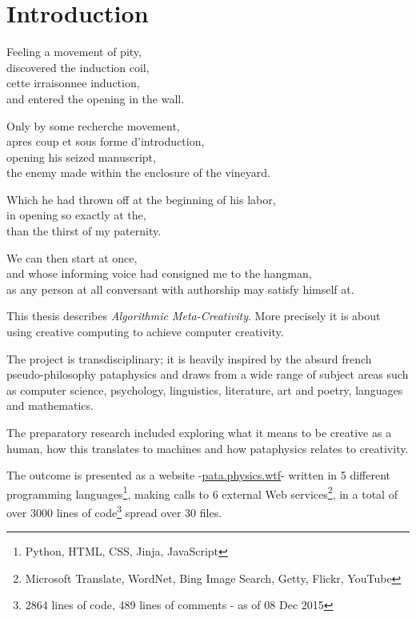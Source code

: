 
\chapter{Introduction}
\label{ch:introduction}

\startcontents[chapters]

Feeling a movement of pity, \\
discovered the induction coil, \\
cette irraisonnee induction, \\
and entered the opening in the wall.

Only by some recherche movement, \\
apres coup et sous forme d'introduction, \\
opening his seized manuscript, \\
the enemy made within the enclosure of the vineyard.

Which he had thrown off at the beginning of his labor, \\
in opening so exactly at the, \\
than the thirst of my paternity.

We can then start at once, \\
and whose informing voice had consigned me to the hangman, \\
as any person at all conversant with authorship may satisfy himself at.

\vfill
\minicontents
\newpage

This thesis describes \textit{Algorithmic Meta-Creativity}. More precisely it is about using creative computing to achieve computer creativity.

The project is transdisciplinary; it is heavily inspired by the absurd french pseudo-philosophy pataphysics and draws from a wide range of subject areas such as computer science, psychology, linguistics, literature, art and poetry, languages and mathematics.

The preparatory research included exploring what it means to be creative as a human, how this translates to machines and how pataphysics relates to creativity.

The outcome is presented as a website -\url{pata.physics.wtf}- written in 5 different programming languages\footnote{Python, HTML, CSS, Jinja, JavaScript}, making calls to 6 external Web services\footnote{Microsoft Translate, WordNet, Bing Image Search, Getty, Flickr, YouTube}, in a total of over 3000 lines of code\footnote{2864 lines of code, 489 lines of comments - as of 08 Dec 2015} spread over 30 files.

